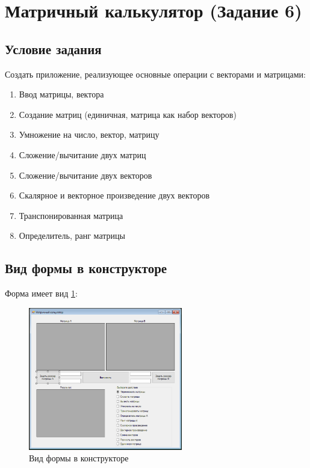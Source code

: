 \section{Матричный калькулятор (Задание 6)}

\subsection{Условие задания}

Создать приложение, реализующее основные операции с векторами и матрицами:

\begin{enumerate}
    \item{Ввод матрицы, вектора}
    \item{Создание матриц (единичная, матрица как набор векторов)}
    \item{Умножение на число, вектор, матрицу}
    \item{Сложение/вычитание двух матриц}
    \item{Сложение/вычитание двух векторов}
    \item{Скалярное и векторное произведение двух векторов}
    \item{Транспонированная матрица}
    \item{Определитель, ранг матрицы}
\end{enumerate}

\subsection{Вид формы в конструкторе}

Форма имеет вид \ref{fig:FormInConstruct6}:

\begin{figure}[!h]
    \centering
    \includegraphics[width = 0.6\textwidth]{images/Task6/FormInConstructor.png}
    \caption{Вид формы в конструкторе}
    \label{fig:FormInConstruct6}
\end{figure}


